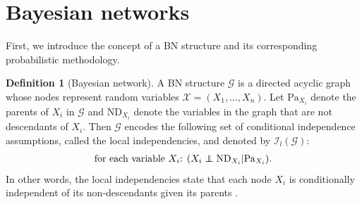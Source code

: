 \documentclass[a4paper, twoside, 11pt]{report}
\theoremstyle{plain}
\theoremstyle{definition}
\newtheorem{definition}[thm]{Definition}
\theoremstyle{remark}
\newcommand{\G}{{\mathcal G}}
\newcommand{\I}{{\mathcal{I}}}
\newcommand{\X}{{\mathcal{X}}}
\begin{document}
\section{Bayesian networks}
First, we introduce the concept of a BN structure and its corresponding probabilistic methodology.
\begin{definition}[Bayesian network]
A BN structure $\G$ is a directed acyclic graph whose nodes represent random variables $\X = (X_1, \ldots , X_n)$. Let $\text{Pa}_{X_i}$ denote the parents of $X_i$ in $\G$ and $\text{ND}_{X_i}$ denote the variables in the graph that are not descendants of $X_i$. Then $\G$ encodes the following set of conditional independence assumptions, called the local independencies, and denoted by $\I_l(\G)$:
\begin{align*}
\text{for each variable $X_i$: $(X_i \indep \text{ND}_{X_i} | \text{Pa}_{X_i})$}.
\end{align*}
In other words, the local independencies state that each node $X_i$ is conditionally independent of its non-descendants given its parents \citep[p.~57]{koller2009probabilistic}.
\end{definition}
\end{document}
